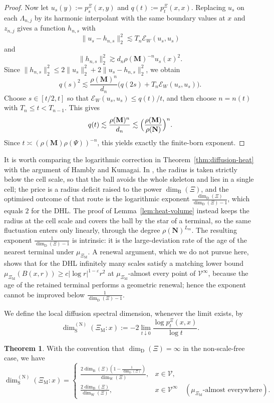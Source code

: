 \documentclass{article}
\theoremstyle{plain}
\theoremstyle{definition}
\newtheorem{theorem}{Theorem}[section]
\newcommand{\dimbox}{\dim_\mathrm{B}}
\newcommand{\dimdeg}{\dim_\mathrm{D}}
\newcommand{\dimwalk}{\dim_\mathrm{W}}
\newcommand{\dimspec}{\dim_\mathrm{S}}
\begin{document}
\begin{proof}
Now let $u_s(y):=p_s^\Xi(x,y)$ and $q(t):=p_t^\Xi(x,x)$.
Replacing $u_s$ on each $\Lambda_{n,j}$ by its harmonic interpolant with the same boundary values at $x$ and $z_{n,j}$ gives a function $h_{n,s}$ with
\[
\|u_s-h_{n,s}\|_2^2
\lesssim
T_n\mathcal E_W(u_s,u_s)
\]
and
\[
\|h_{n,s}\|_2^2
\gtrsim
d_n\rho(\mathbf M)^{-n}u_s(x)^2.
\]
Since $\|h_{n,s}\|_2^2\le 2\|u_s\|_2^2+2\|u_s-h_{n,s}\|_2^2$, we obtain
\[
q(s)^2
\lesssim
\frac{\rho(\mathbf M)^n}{d_n}\bigl(q(2s)+T_n\mathcal E_W(u_s,u_s)\bigr).
\]
Choose $s\in[t/2,t]$ so that $\mathcal E_W(u_s,u_s)\le q(t)/t$, and then choose $n=n(t)$ with $T_n\le t<T_{n-1}$.
This gives
\[
q(t)\lesssim \frac{\rho(\mathbf M)^n}{d_n}\lesssim \Bigl(\frac{\rho(\mathbf M)}{\rho(\mathbf N)}\Bigr)^n.
\]
Since $t\asymp (\rho(\mathbf M)\rho(\Psi))^{-n}$, this yields exactly the finite-born exponent.
\end{proof}

It is worth comparing the logarithmic correction in Theorem~\ref{thm:diffusion-heat} with the argument of Hambly and Kumagai.
In \cite{hambly2010diffusion}, the radius is taken strictly below the cell scale, so that the ball avoids the whole skeleton and lies in a single cell; the price is a radius deficit raised to the power $\dimbox(\Xi)$, and the optimised outcome of that route is the logarithmic exponent $\frac{\dimdeg(\Xi)}{\dimdeg(\Xi)-1}$, which equals $2$ for the DHL.
The proof of Lemma~\ref{lem:heat-volume} instead keeps the radius at the cell scale and covers the ball by the star of a terminal, so the same fluctuation enters only linearly, through the degree $\rho(\mathbf N)^{L_m}$.
The resulting exponent $\frac{1}{\dimdeg(\Xi)-1}$ is intrinsic: it is the large-deviation rate of the age of the nearest terminal under $\mu_{\Xi_{\mathrm M}}$.
A renewal argument, which we do not pursue here, shows that for the DHL infinitely many scales satisfy a matching lower bound $\mu_{\Xi_{\mathrm M}}(B(x,r))\ge c|\log r|^{1-\varepsilon}r^{2}$ at $\mu_{\Xi_{\mathrm M}}$-almost every point of $\mathscr V^\infty$, because the age of the retained terminal performs a geometric renewal; hence the exponent cannot be improved below $\frac{1}{\dimdeg(\Xi)-1}$.

We define the local diffusion spectral dimension, whenever the limit exists, by
\[
\dimspec^{(\mathrm N)}(\Xi_{\mathrm M}:x)
:=
-2 \lim_{t \downarrow 0} \frac{\log p_t^\Xi(x,x)}{\log t}.
\]

\begin{theorem}\label{thm:diffusion-spectral}
With the convention that $\dimdeg(\Xi)=\infty$ in the non-scale-free case, we have
\[
\dimspec^{(\mathrm N)}(\Xi_{\mathrm M}:x)
=
\begin{cases}
\displaystyle
\frac{2\dimbox(\Xi)\left(1-\frac{1}{\dimdeg(\Xi)}\right)}{\dimwalk(\Xi)},
&
x \in \mathscr V,
\\[2mm]
\displaystyle
\frac{2\dimbox(\Xi)}{\dimwalk(\Xi)},
&
x \in \mathscr V^\infty
\quad
(\mu_{\Xi_{\mathrm M}}\text{-almost everywhere}).
\end{cases}
\]
\end{theorem}
\end{document}
